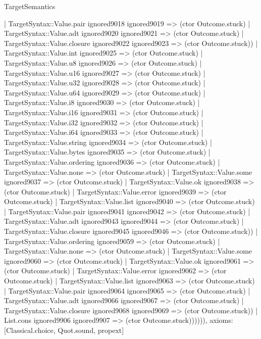 \begin{lexlean}{TargetSemantics}
\begin{semanticmodule}
{                  | TargetSyntax::Value.pair ignored9018 ignored9019 => (ctor Outcome.stuck)
                  | TargetSyntax::Value.adt ignored9020 ignored9021 => (ctor Outcome.stuck)
                  | TargetSyntax::Value.closure ignored9022 ignored9023 => (ctor Outcome.stuck))
                | TargetSyntax::Value.int ignored9025 => (ctor Outcome.stuck)
                | TargetSyntax::Value.u8 ignored9026 => (ctor Outcome.stuck)
                | TargetSyntax::Value.u16 ignored9027 => (ctor Outcome.stuck)
                | TargetSyntax::Value.u32 ignored9028 => (ctor Outcome.stuck)
                | TargetSyntax::Value.u64 ignored9029 => (ctor Outcome.stuck)
                | TargetSyntax::Value.i8 ignored9030 => (ctor Outcome.stuck)
                | TargetSyntax::Value.i16 ignored9031 => (ctor Outcome.stuck)
                | TargetSyntax::Value.i32 ignored9032 => (ctor Outcome.stuck)
                | TargetSyntax::Value.i64 ignored9033 => (ctor Outcome.stuck)
                | TargetSyntax::Value.string ignored9034 => (ctor Outcome.stuck)
                | TargetSyntax::Value.bytes ignored9035 => (ctor Outcome.stuck)
                | TargetSyntax::Value.ordering ignored9036 => (ctor Outcome.stuck)
                | TargetSyntax::Value.none => (ctor Outcome.stuck)
                | TargetSyntax::Value.some ignored9037 => (ctor Outcome.stuck)
                | TargetSyntax::Value.ok ignored9038 => (ctor Outcome.stuck)
                | TargetSyntax::Value.error ignored9039 => (ctor Outcome.stuck)
                | TargetSyntax::Value.list ignored9040 => (ctor Outcome.stuck)
                | TargetSyntax::Value.pair ignored9041 ignored9042 => (ctor Outcome.stuck)
                | TargetSyntax::Value.adt ignored9043 ignored9044 => (ctor Outcome.stuck)
                | TargetSyntax::Value.closure ignored9045 ignored9046 => (ctor Outcome.stuck))
              | TargetSyntax::Value.ordering ignored9059 => (ctor Outcome.stuck)
              | TargetSyntax::Value.none => (ctor Outcome.stuck)
              | TargetSyntax::Value.some ignored9060 => (ctor Outcome.stuck)
              | TargetSyntax::Value.ok ignored9061 => (ctor Outcome.stuck)
              | TargetSyntax::Value.error ignored9062 => (ctor Outcome.stuck)
              | TargetSyntax::Value.list ignored9063 => (ctor Outcome.stuck)
              | TargetSyntax::Value.pair ignored9064 ignored9065 => (ctor Outcome.stuck)
              | TargetSyntax::Value.adt ignored9066 ignored9067 => (ctor Outcome.stuck)
              | TargetSyntax::Value.closure ignored9068 ignored9069 => (ctor Outcome.stuck))
            | List.cons ignored9906 ignored9907 => (ctor Outcome.stuck)))))),
  axioms: [Classical.choice, Quot.sound, propext]
}


\end{semanticmodule}
\end{lexlean}
